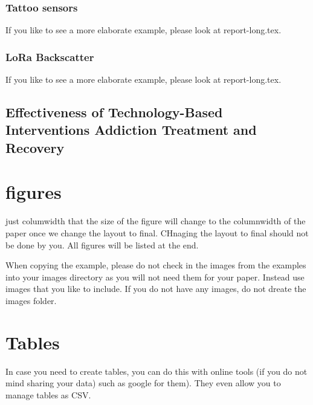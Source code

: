 \documentclass[sigconf]{acmart}
\begin{document}
\subsubsection{Tattoo sensors}

If you like to see a more elaborate example, please look at
report-long.tex. 


\subsubsection{LoRa Backscatter}

If you like to see a more elaborate example, please look at
report-long.tex. 


\subsection{Effectiveness of Technology-Based Interventions Addiction Treatment and Recovery}


\section{figures}

just columwidth that the size of the figure will change to the
columnwidth of the paper once we change the layout to final. CHnaging
the layout to final should not be done by you. All figures will be
listed at the end.


When copying the example, please do not check in the images from the
examples into your images directory as you will not need them for your
paper. Instead use images that you like to include. If you do not have
any images, do not dreate the images folder.

\section{Tables}

In case you need to create tables, you can do this with online tools
(if you do not mind sharing your data) such as
google for them). They even allow you to manage tables as CSV.
\end{document}
